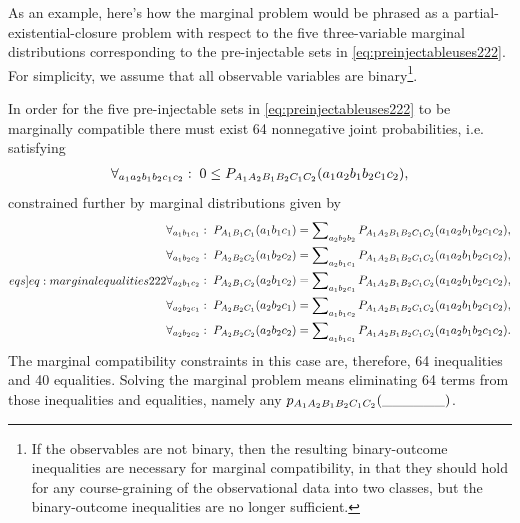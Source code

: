 As an example, here's how the marginal problem would be phrased as a partial-existential-closure problem with respect to the five three-variable marginal distributions corresponding to the pre-injectable sets in \cref{eq:preinjectableuses222}. For simplicity, we assume that all observable variables are binary\footnote{If the observables are not binary, then the resulting  binary-outcome inequalities are necessary for marginal compatibility, in that they should hold for any course-graining of the observational data into two classes, but the binary-outcome inequalities are no longer sufficient.}.

In order for the five pre-injectable sets in \cref{eq:preinjectableuses222} to be marginally compatible there must exist 64 nonnegative joint probabilities, i.e. satisfying
\begin{align}\label{eq:nonnegativity}
\forall_{a_1 a_2 b_1 b_2 c_1 c_2}:\;0\leq \pdf[A_1 A_2 B_1 B_2 C_1 C_2]{a_1 a_2 b_1 b_2 c_1 c_2},
\end{align}
constrained further by marginal distributions given by
\begin{align}\label[eqs]{eq:marginalequalities222}
\begin{split}
&\forall_{a_1 b_1 c_1}:\;\pdf[A_1 B_1 C_1]{a_1 b_1 c_1} = \sum\nolimits_{a_2 b_2 b_2}\pdf[A_1 A_2 B_1 B_2 C_1 C_2]{a_1 a_2 b_1 b_2 c_1 c_2},\\
&\forall_{a_1 b_2 c_2}:\;\pdf[A_2 B_2 C_2]{a_1 b_2 c_2} = \sum\nolimits_{a_2 b_1 c_1}\pdf[A_1 A_2 B_1 B_2 C_1 C_2]{a_1 a_2 b_1 b_2 c_1 c_2},\\
&\forall_{a_2 b_1 c_2}:\;\pdf[A_2 B_1 C_2]{a_2 b_1 c_2} = \sum\nolimits_{a_1 b_2 c_1}\pdf[A_1 A_2 B_1 B_2 C_1 C_2]{a_1 a_2 b_1 b_2 c_1 c_2},\\
&\forall_{a_2 b_2 c_1}:\;\pdf[A_2 B_2 C_1]{a_2 b_2 c_1} = \sum\nolimits_{a_1 b_1 c_2}\pdf[A_1 A_2 B_1 B_2 C_1 C_2]{a_1 a_2 b_1 b_2 c_1 c_2},\\
&\forall_{a_2 b_2 c_2}:\;\pdf[A_2 B_2 C_2]{a_2 b_2 c_2} = \sum\nolimits_{a_1 b_1 c_1}\pdf[A_1 A_2 B_1 B_2 C_1 C_2]{a_1 a_2 b_1 b_2 c_1 c_2}.
\end{split}
\end{align}
The marginal compatibility constraints in this case are, therefore, 64 inequalities and 40 equalities. Solving the marginal problem means eliminating 64 terms from those inequalities and equalities, namely any $\p[A_1 A_2 B_1 B_2 C_1 C_2]{\_\_\_\_\_\_}$. 


